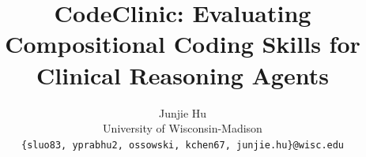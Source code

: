 \documentclass{article}
\title{CodeClinic: Evaluating Compositional Coding Skills for Clinical Reasoning Agents}
\author{%
  Junjie Hu \\
  University of Wisconsin-Madison \\
  \texttt{\{sluo83, yprabhu2, ossowski, kchen67, junjie.hu\}@wisc.edu} \\
}
\begin{document}
\maketitle


\begin{abstract}
  
\end{abstract}













\appendix


\newpage

\end{document}
